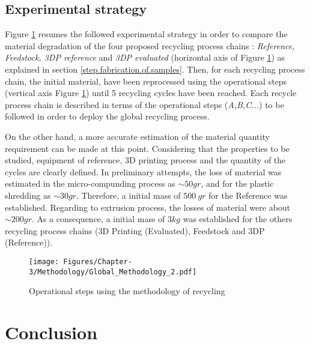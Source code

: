 \subsection{Experimental strategy}
\label{Subsection.operational.methodology}
Figure \ref{Operational.methodology} resumes the followed experimental strategy in order to compare the material degradation of the four proposed recycling process chains : \textit{Reference, Feedstock, 3DP reference} and \textit{3DP evaluated} (horizontal axis of Figure \ref{Operational.methodology}) as explained in section \ref{step.fabrication.of.samples}.
Then, for each recycling process chain, the initial material, have been reprocessed using the operational steps (vertical axis Figure \ref{Operational.methodology}) until 5 recycling cycles have been reached. Each recycle process chain is described in terms of the operational steps (\textit{A,B,C...}) to be followed in order to deploy the global recycling process.

On the other hand, a more accurate estimation of the material quantity requirement can be made at this point. Considering that the properties to be studied, equipment of reference, 3D printing process and the quantity of the cycles are clearly defined.  
In preliminary attempts, the loss of material was estimated in the micro-compunding process as  $\sim50gr$, and for the plastic shredding as $\sim30gr$.
Therefore, a initial mass of $500~gr$ for the Reference was established.   
Regarding to extrusion process, the losses of material were about $\sim200gr$. 
As a consequence, a initial mass of $3kg$ was established for the others recycling process chains (3D Printing (Evaluated), Feedstock and 3DP (Reference)).




\begin{figure}[H]
	\centering
	\texttt{[image: Figures/Chapter-3/Methodology/Global\_Methodology\_2.pdf]}
	\caption{Operational  steps using the methodology of recycling}
	\label{Operational.methodology}
\end{figure}



\section{Conclusion}

